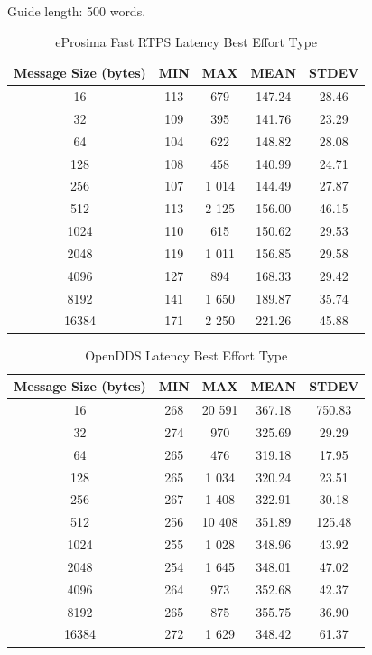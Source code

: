 \documentclass{csfourzero}
\begin{document}
Guide length: 500 words.
\begin{table}[!h]
	\centering
	\caption{eProsima Fast RTPS Latency Best Effort Type}
	\label{eProima-latency-table}
	\begin{tabular}{|c|c|c|c|c|}
		\hline 
		Message Size (bytes)& MIN & MAX & MEAN & STDEV \\ 
		\hline 
		16 & 113 & 679 & 147.24 & 28.46 \\ 
		\hline 
		32 & 109 & 395 & 141.76 & 23.29 \\ 
		\hline 
		64 & 104 & 622 & 148.82 & 28.08 \\ 
		\hline 
		128 & 108 & 458 & 140.99 & 24.71 \\ 
		\hline 
		256 & 107 & 1 014 & 144.49 & 27.87 \\ 
		\hline 
		512 & 113 & 2 125 & 156.00 & 46.15 \\ 
		\hline 
		1024 & 110 & 615 & 150.62 & 29.53 \\ 
		\hline 
		2048 & 119 & 1 011 & 156.85 & 29.58 \\ 
		\hline 
		4096 & 127 & 894 & 168.33 & 29.42 \\ 
		\hline 
		8192 & 141 & 1 650 & 189.87 & 35.74 \\ 
		\hline 
		16384 & 171 & 2 250 & 221.26 & 45.88 \\ 
		\hline 
	\end{tabular}
\end{table}

\begin{table}[!h]
	\centering
	\caption{OpenDDS Latency Best Effort Type}
	\label{openDDS-latency-table}
	\begin{tabular}{|c|c|c|c|c|}
		\hline 
		Message Size (bytes)& MIN & MAX & MEAN & STDEV \\ 
		\hline 
		16 & 268 & 20 591 & 367.18 & 750.83 \\ 
		\hline 
		32 & 274 & 970 & 325.69 & 29.29 \\ 
		\hline 
		64 & 265 & 476 & 319.18 & 17.95 \\ 
		\hline 
		128 & 265 & 1 034 & 320.24 & 23.51 \\ 
		\hline 
		256 & 267 & 1 408 & 322.91 & 30.18 \\ 
		\hline 
		512 & 256 & 10 408 & 351.89 & 125.48 \\ 
		\hline 
		1024 & 255 & 1 028 & 348.96 & 43.92 \\ 
		\hline 
		2048 & 254 & 1 645 & 348.01 & 47.02 \\ 
		\hline 
		4096 & 264 & 973 & 352.68 & 42.37 \\ 
		\hline 
		8192 & 265 & 875 & 355.75 & 36.90 \\ 
		\hline 
		16384 & 272 & 1 629 & 348.42 & 61.37 \\ 
		\hline 
	\end{tabular}
\end{table}
\end{document}
